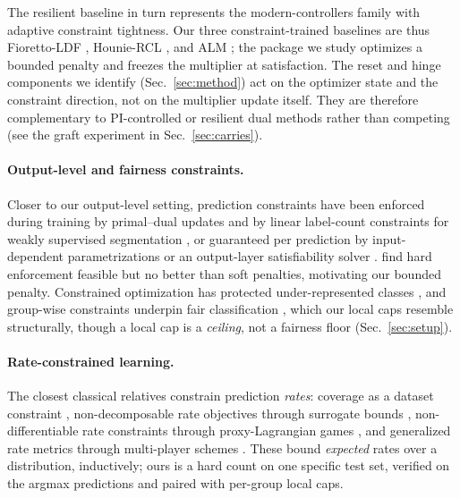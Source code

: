 \documentclass[10pt]{article}
\begin{document}
The resilient baseline {in turn}
represents the modern-controllers family with adaptive constraint
tightness. %
{Our three constraint-trained baselines are thus Fioretto-LDF
\citep{fioretto2020lagrangian}, Hounie-RCL \citep{hounie2023resilient}, and ALM
\citep{bertsekas1982constrained}};
the package we study optimizes a bounded penalty and freezes the
multiplier at satisfaction. The reset and hinge components we identify
(Sec.~\ref{sec:method}) act on the optimizer state and the constraint
direction, not on the multiplier update itself. They are therefore
complementary to PI-controlled or resilient dual methods rather than
competing (see the graft experiment in Sec.~\ref{sec:carries}).

\paragraph{Output-level and fairness constraints.}
Closer to our output-level setting, prediction constraints have been enforced
during training by primal--dual updates \citep{nandwani2019primal} and by
linear label-count constraints for weakly supervised segmentation
\citep{pathak2015constrained}, or guaranteed per prediction by
input-dependent parametrizations \citep{brosowsky2021sample} or an
output-layer satisfiability solver \citep{goyal2024deepsade}.
\citet{marquez2017imposing} find hard enforcement feasible but no better than
soft penalties, motivating our bounded penalty. Constrained optimization has
protected under-represented classes \citep{sangalli2021constrained}, and
group-wise constraints underpin fair classification
\citep{bilal2015fairness,agarwal2018reductions,kearns2018preventing,donini2018empirical},
which our local caps resemble structurally, though a local cap is a
\emph{ceiling}, not a fairness floor (Sec.~\ref{sec:setup}).

\paragraph{Rate-constrained learning.}
The closest classical relatives constrain prediction \emph{rates}:
coverage as a dataset constraint \citep{goh2016satisfying}, non-decomposable
rate objectives through surrogate bounds \citep{eban2017scalable},
non-differentiable rate constraints through proxy-Lagrangian games
\citep{cotter2019optimization}, and generalized rate metrics through
multi-player schemes \citep{narasimhan2019optimizing}. These bound
\emph{expected} rates over a distribution, inductively; ours is a hard count
on one specific test set, verified on the argmax predictions and paired with
per-group local caps.
\end{document}

